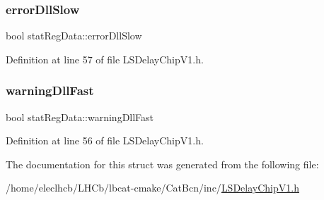 \subsubsection{\texorpdfstring{error\+Dll\+Slow}{errorDllSlow}}
{\footnotesize\ttfamily bool stat\+Reg\+Data\+::error\+Dll\+Slow}



Definition at line 57 of file L\+S\+Delay\+Chip\+V1.\+h.

\mbox{\label{structstatRegData_ab2c309fd8e307f289133e11a72d54dc2}} 
\subsubsection{\texorpdfstring{warning\+Dll\+Fast}{warningDllFast}}
{\footnotesize\ttfamily bool stat\+Reg\+Data\+::warning\+Dll\+Fast}



Definition at line 56 of file L\+S\+Delay\+Chip\+V1.\+h.



The documentation for this struct was generated from the following file\+:\begin{DoxyCompactItemize}
\item 
/home/eleclhcb/\+L\+H\+Cb/lbcat-\/cmake/\+Cat\+Bcn/inc/\hyperlink{LSDelayChipV1_8h}{L\+S\+Delay\+Chip\+V1.\+h}\end{DoxyCompactItemize}
